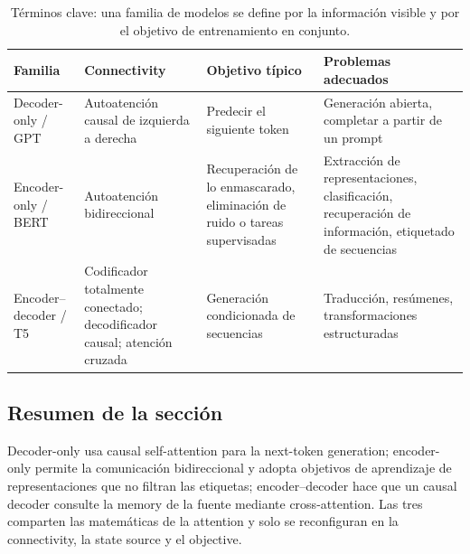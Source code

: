 \begin{table}[H]
\centering
\small
\begin{tabularx}{\textwidth}{L{2.8cm}L{3.5cm}L{3.2cm}X}
\toprule
Familia & Connectivity & Objetivo típico & Problemas adecuados \\
\midrule
Decoder-only / GPT & Autoatención causal de izquierda a derecha & Predecir el siguiente token & Generación abierta, completar a partir de un prompt \\
Encoder-only / BERT & Autoatención bidireccional & Recuperación de lo enmascarado, eliminación de ruido o tareas supervisadas & Extracción de representaciones, clasificación, recuperación de información, etiquetado de secuencias \\
Encoder--decoder / T5 & Codificador totalmente conectado; decodificador causal; atención cruzada & Generación condicionada de secuencias & Traducción, resúmenes, transformaciones estructuradas \\
\bottomrule
\end{tabularx}
\caption{Términos clave: una familia de modelos se define por la información visible y por el objetivo de entrenamiento en conjunto.}
\end{table}


\subsection{Resumen de la sección}

Decoder-only usa causal self-attention para la next-token generation; encoder-only permite la comunicación bidireccional y adopta objetivos de aprendizaje de representaciones que no filtran las etiquetas; encoder--decoder hace que un causal decoder consulte la memory de la fuente mediante cross-attention. Las tres comparten las matemáticas de la attention y solo se reconfiguran en la connectivity, la state source y el objective.
